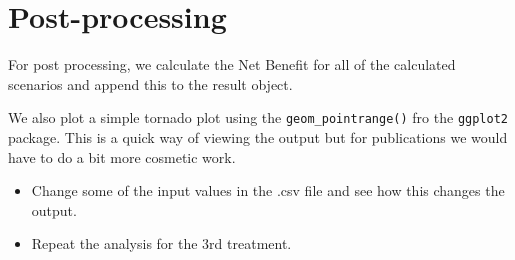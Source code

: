 \section{Post-processing}
For post processing, we calculate the Net Benefit for all of the calculated scenarios and append this to the result object.

We also plot a simple tornado plot using the \texttt{geom\_pointrange()} fro the \texttt{ggplot2} package. This is a quick way of viewing the output but for publications we would have to do a bit more cosmetic work.

\begin{itemize}
\item Change some of the input values in the .csv file and see how this changes the output.
\item Repeat the analysis for the 3rd treatment.
\end{itemize}

